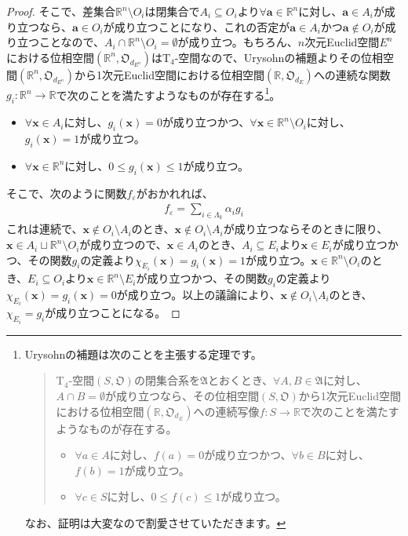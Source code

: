 \documentclass[dvipdfmx]{jsarticle}
\begin{document}
\begin{proof}
そこで、差集合$\mathbb{R}^{n} \setminus O_{i}$は閉集合で$A_{i} \subseteq O_{i}$より$\forall\mathbf{a} \in \mathbb{R}^{n}$に対し、$\mathbf{a} \in A_{i}$が成り立つなら、$\mathbf{a} \in O_{i}$が成り立つことになり、これの否定が$\mathbf{a} \in A_{i}$かつ$\mathbf{a} \notin O_{i}$が成り立つことなので、$A_{i} \cap \mathbb{R}^{n} \setminus O_{i} = \emptyset$が成り立つ。もちろん、$n$次元Euclid空間$E^{n}$における位相空間$\left( \mathbb{R}^{n},\mathfrak{O}_{d_{E^{n}}} \right)$は$\mathrm{T}_{4}$-空間なので、Urysohnの補題よりその位相空間$\left( \mathbb{R}^{n},\mathfrak{O}_{d_{E^{n}}} \right)$から1次元Euclid空間における位相空間$\left( \mathbb{R},\mathfrak{O}_{d_{E}} \right)$への連続な関数$g_{i}:\mathbb{R}^{n} \rightarrow \mathbb{R}$で次のことを満たすようなものが存在する\footnote{Urysohnの補題は次のことを主張する定理です。
  \begin{quote}
  $\mathrm{T}_{4}$-空間$\left( S,\mathfrak{O} \right)$の閉集合系を$\mathfrak{A}$とおくとき、$\forall A,B \in \mathfrak{A}$に対し、$A \cap B = \emptyset$が成り立つなら、その位相空間$\left( S,\mathfrak{O} \right)$から1次元Euclid空間における位相空間$\left( \mathbb{R},\mathfrak{O}_{d_{E}} \right)$への連続写像$f:S \rightarrow \mathbb{R}$で次のことを満たすようなものが存在する。
  \begin{itemize}
  \item
    $\forall a \in A$に対し、$f(a) = 0$が成り立つかつ、$\forall b \in B$に対し、$f(b) = 1$が成り立つ。
  \item
    $\forall c \in S$に対し、$0 \leq f(c) \leq 1$が成り立つ。
  \end{itemize}
  \end{quote}
なお、証明は大変なので割愛させていただきます。}。
\begin{itemize}
\item
  $\forall\mathbf{x} \in A_{i}$に対し、$g_{i}\left( \mathbf{x} \right) = 0$が成り立つかつ、$\forall\mathbf{x} \in \mathbb{R}^{n} \setminus O_{i}$に対し、$g_{i}\left( \mathbf{x} \right) = 1$が成り立つ。
\item
  $\forall\mathbf{x} \in \mathbb{R}^{n}$に対し、$0 \leq g_{i}\left( \mathbf{x} \right) \leq 1$が成り立つ。
\end{itemize}\par
そこで、次のように関数$f_{\varepsilon}$がおかれれば、
\begin{align*}
f_{\varepsilon} = \sum_{i \in \varLambda_{k}} {\alpha_{i}g_{i}}
\end{align*}
これは連続で、$\mathbf{x} \notin O_{i} \setminus A_{i}$のとき、$\mathbf{x} \notin O_{i} \setminus A_{i}$が成り立つならそのときに限り、$\mathbf{x} \in A_{i} \sqcup \mathbb{R}^{n} \setminus O_{i}$が成り立つので、$\mathbf{x} \in A_{i}$のとき、$A_{i} \subseteq E_{i}$より$\mathbf{x} \in E_{i}$が成り立つかつ、その関数$g_{i}$の定義より$\chi_{E_{i}}\left( \mathbf{x} \right) = g_{i}\left( \mathbf{x} \right) = 1$が成り立つ。$\mathbf{x} \in \mathbb{R}^{n} \setminus O_{i}$のとき、$E_{i} \subseteq O_{i}$より$\mathbf{x} \in \mathbb{R}^{n} \setminus E_{i}$が成り立つかつ、その関数$g_{i}$の定義より$\chi_{E_{i}}\left( \mathbf{x} \right) = g_{i}\left( \mathbf{x} \right) = 0$が成り立つ。以上の議論により、$\mathbf{x} \notin O_{i} \setminus A_{i}$のとき、$\chi_{E_{i}} = g_{i}$が成り立つことになる。\par

\end{proof}
\end{document}
